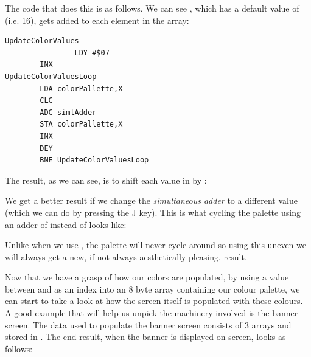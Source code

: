 The code that does this is as follows. We can see , which has a default value of (i.e. 16),
gets added to each element in the array:
\begin{lstlisting}
UpdateColorValues   
				LDY #$07
        INX 
UpdateColorValuesLoop
        LDA colorPallette,X
        CLC 
        ADC simlAdder
        STA colorPallette,X
        INX 
        DEY 
        BNE UpdateColorValuesLoop
\end{lstlisting}

The result, as we can see, is to shift each value in  by :


We get a better result if we change the \textit{simultaneous adder} to a different value (which we can do by
pressing the J key). This is what cycling the palette using an adder of  instead of 
looks like:


Unlike when we use , the palette will never cycle around so using this uneven  we will
always get a new, if not always aesthetically pleasing, result.

Now that we have a grasp of how our colors are populated, by using a value between  and  as an
index into an 8 byte array containing our colour palette, we can start to take a look at how the screen itself
is populated with these colours. A good example that will help us unpick the machinery involved is the banner
screen. The data used to populate the banner screen consists of 3 arrays and
stored in . The end result, when the banner is displayed on screen, looks as follows:



